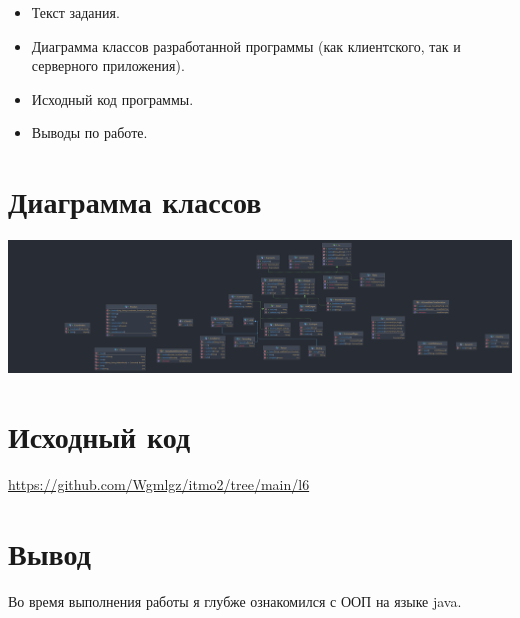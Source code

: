 \documentclass{article}
\begin{document}
\begin{itemize}
  \item Текст задания.
  \item Диаграмма классов разработанной программы (как клиентского, так и серверного приложения).
  \item Исходный код программы.
  \item Выводы по работе.
\end{itemize}


\section*{Диаграмма классов}

\begin{center}
  \includegraphics[scale=0.07]{diagram.png}
\end{center}

\section*{Исходный код}
\url{https://github.com/Wgmlgz/itmo2/tree/main/l6}

\section*{Вывод}
Во время выполнения работы я глубже ознакомился с ООП на языке java.
\end{document}

